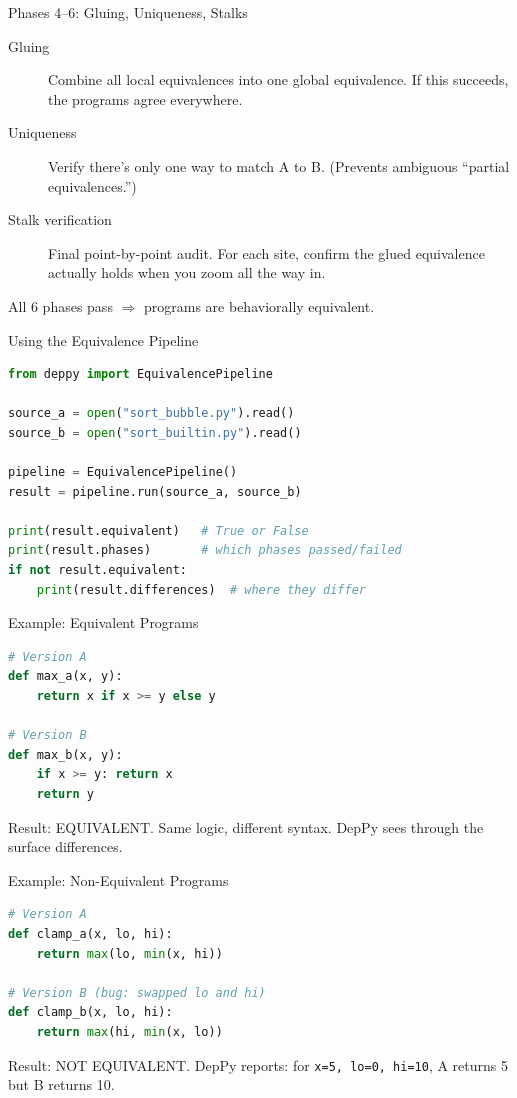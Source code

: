 \documentclass[aspectratio=169,10pt]{beamer}
\begin{document}
\begin{frame}{Phases 4--6: Gluing, Uniqueness, Stalks}
\begin{description}
  \item[Gluing] Combine all local equivalences into one global equivalence. If this succeeds, the programs agree everywhere.
  \item[Uniqueness] Verify there's only one way to match A to B. (Prevents ambiguous ``partial equivalences.'')
  \item[Stalk verification] Final point-by-point audit. For each site, confirm the glued equivalence actually holds when you zoom all the way in.
\end{description}
\vspace{0.3em}
All 6 phases pass $\Rightarrow$ \textcolor{safe}{programs are behaviorally equivalent}.
\end{frame}

\begin{frame}[fragile]{Using the Equivalence Pipeline}
\begin{lstlisting}[language=Python, basicstyle=\ttfamily\scriptsize]
from deppy import EquivalencePipeline

source_a = open("sort_bubble.py").read()
source_b = open("sort_builtin.py").read()

pipeline = EquivalencePipeline()
result = pipeline.run(source_a, source_b)

print(result.equivalent)   # True or False
print(result.phases)       # which phases passed/failed
if not result.equivalent:
    print(result.differences)  # where they differ
\end{lstlisting}
\end{frame}

\begin{frame}[fragile]{Example: Equivalent Programs}
\begin{lstlisting}[language=Python, basicstyle=\ttfamily\scriptsize]
# Version A
def max_a(x, y):
    return x if x >= y else y

# Version B
def max_b(x, y):
    if x >= y: return x
    return y
\end{lstlisting}
\vspace{0.3em}
Result: \textcolor{safe}{EQUIVALENT}. Same logic, different syntax. DepPy sees through the surface differences.
\end{frame}

\begin{frame}[fragile]{Example: Non-Equivalent Programs}
\begin{lstlisting}[language=Python, basicstyle=\ttfamily\scriptsize]
# Version A
def clamp_a(x, lo, hi):
    return max(lo, min(x, hi))

# Version B (bug: swapped lo and hi)
def clamp_b(x, lo, hi):
    return max(hi, min(x, lo))
\end{lstlisting}
\vspace{0.3em}
Result: \textcolor{danger}{NOT EQUIVALENT}. DepPy reports: for \texttt{x=5, lo=0, hi=10}, A returns 5 but B returns 10.
\end{frame}
\end{document}
